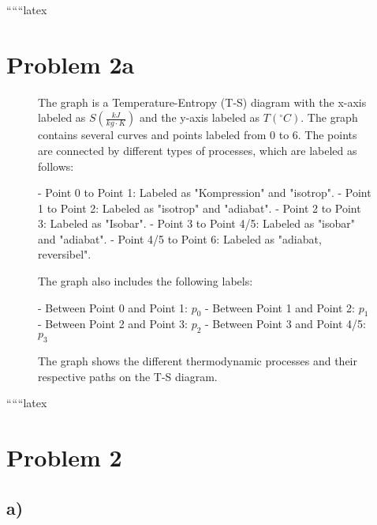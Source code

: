 
``````latex


\section*{Problem 2a}

\begin{figure}[h]
    \centering
    The graph is a Temperature-Entropy (T-S) diagram with the x-axis labeled as $S \left( \frac{kJ}{kg \cdot K} \right)$ and the y-axis labeled as $T \left( ^\circ C \right)$. The graph contains several curves and points labeled from 0 to 6. The points are connected by different types of processes, which are labeled as follows:
    
    - Point 0 to Point 1: Labeled as "Kompression" and "isotrop".
    - Point 1 to Point 2: Labeled as "isotrop" and "adiabat".
    - Point 2 to Point 3: Labeled as "Isobar".
    - Point 3 to Point 4/5: Labeled as "isobar" and "adiabat".
    - Point 4/5 to Point 6: Labeled as "adiabat, reversibel".
    
    The graph also includes the following labels:
    
    - Between Point 0 and Point 1: $p_0$
    - Between Point 1 and Point 2: $p_1$
    - Between Point 2 and Point 3: $p_2$
    - Between Point 3 and Point 4/5: $p_3$
    
    The graph shows the different thermodynamic processes and their respective paths on the T-S diagram.

\end{figure}

``````latex


\section*{Problem 2}

\subsection*{a)}

